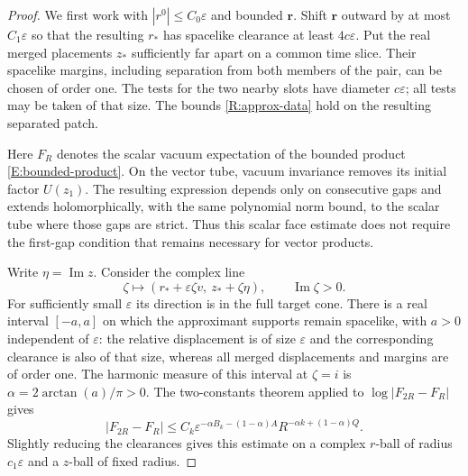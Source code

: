 \begin{proof}
We first work with $|r^0|\leq C_0\varepsilon$ and bounded
$\mathbf r$.  Shift $\mathbf r$ outward by at most $C_1\varepsilon$
so that the resulting $r_*$ has spacelike clearance at least
$4c\varepsilon$.  Put the real merged placements $z_*$ sufficiently
far apart on a common time slice.  Their spacelike margins, including
separation from both members of the pair, can be chosen of order one.
The tests for the two nearby slots have diameter $c\varepsilon$;
all tests may be taken of that size.  The bounds
\eqref{R:approx-data} hold on the resulting separated patch.

Here $F_R$ denotes the scalar vacuum expectation of the bounded
product \eqref{E:bounded-product}.  On the vector tube, vacuum
invariance removes its initial factor $U(z_1)$.  The resulting
expression depends only on consecutive gaps and extends holomorphically,
with the same polynomial norm bound, to the scalar tube where those
gaps are strict.  Thus this scalar face estimate does not require the
first-gap condition that remains necessary for vector products.

Write $\eta=\operatorname{Im}z$.  Consider the complex line
\begin{equation}\label{R:anisotropic-line}
 \zeta\longmapsto
     (r_*+\varepsilon\zeta v,\ z_*+\zeta\eta),
       \qquad \operatorname{Im}\zeta>0.
\end{equation}
For sufficiently small $\varepsilon$ its direction is in the full
target cone.  There is a real interval $[-a,a]$ on which the
approximant supports remain spacelike, with $a>0$ independent of
$\varepsilon$: the relative displacement is of size $\varepsilon$
and the corresponding clearance is also of that size, whereas all
merged displacements and margins are of order one.  The harmonic
measure of this interval at $\zeta=i$ is
$\alpha=2\arctan(a)/\pi>0$.  The two-constants theorem applied to
$\log|F_{2R}-F_R|$ gives
\[
 |F_{2R}-F_R|
 \leq C_k\varepsilon^{-\alpha B_k-(1-\alpha)A}
           R^{-\alpha k+(1-\alpha)Q}.
\]
Slightly reducing the clearances gives this estimate on a complex
$r$-ball of radius $c_1\varepsilon$ and a $z$-ball of fixed radius.


\end{proof}

